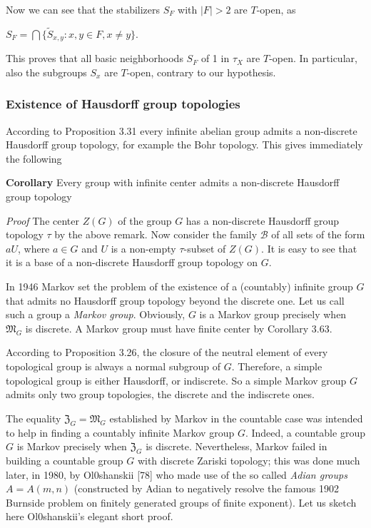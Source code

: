 \documentclass[12pt]{article}
\begin{document}
        Now we can see that the stabilizers $S_F$ with $|F| > 2$ are $T$-open, as


        $S_F = \bigcap \{\tilde{S}_{x,y} : x, y \in F, x \neq y\}$.


        This proves that all basic neighborhoods $S_F$ of 1 in $\tau_X$ are $T$-open. In particular, also the subgroups $S_x$ are
    $T$-open, contrary to our hypothesis.


    \subsubsection{Existence of Hausdorff group topologies}


        According to Proposition 3.31 every infinite abelian group admits a non-discrete Hausdorff group topology, for
    example the Bohr topology. This gives immediately the following


    \textbf{Corollary} Every group with infinite center admits a non-discrete Hausdorff group topology


    \emph{Proof} The center $Z(G)$ of the group $G$ has a non-discrete Hausdorff group topology $\tau$ by the above remark.
    Now consider the family $\mathcal{B}$ of all sets of the form $aU$, where $a \in G$ and $U$ is a non-empty $\tau$-subset of $Z(G)$. It
    is easy to see that it is a base of a non-discrete Hausdorff group topology on $G$.


        In 1946 Markov set the problem of the existence of a (countably) infinite group $G$ that admits no Hausdorff
    group topology beyond the discrete one. Let us call such a group a \emph{Markov group}. Obviously, $G$ is a Markov
    group precisely when $\mathfrak{M}_G$ is discrete. A Markov group must have finite center by Corollary 3.63.
    

        According to Proposition 3.26, the closure of the neutral element of every topological group is always a
    normal subgroup of $G$. Therefore, a simple topological group is either Hausdorff, or indiscrete. So a simple
    Markov group $G$ admits only two group topologies, the discrete and the indiscrete ones.


        The equality $\mathfrak{Z}_G = \mathfrak{M}_G$ established by Markov in the countable case was intended to help in finding a
    countably infinite Markov group $G$. Indeed, a countable group $G$ is Markov precisely when $\mathfrak{Z}_G$ is discrete.
    Nevertheless, Markov failed in building a countable group $G$ with discrete Zariski topology; this was done much
    later, in 1980, by Ol0shanskii [78] who made use of the so called \emph{Adian groups} $A = A(m, n)$ (constructed by
    Adian to negatively resolve the famous 1902 Burnside problem on finitely generated groups of finite exponent).
    Let us sketch here Ol0shanskii's elegant short proof.
\end{document}
